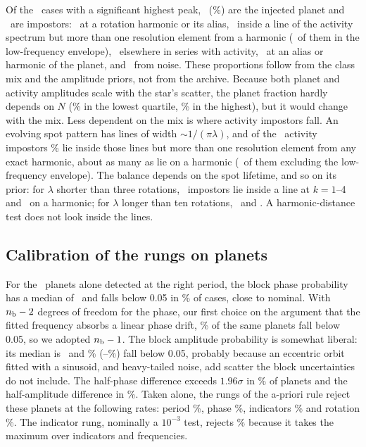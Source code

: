 Of the \nmNDet\ cases with a significant highest peak, \nmNDetPlanet\
(\nmDetPlanetPct\%) are the injected planet and \nmNDetImp\ are impostors:
\nmImpRotHarm\ at a rotation harmonic or its alias, \nmImpRotLine\ inside a line of the
activity spectrum but more than one resolution element from a harmonic (\nmImpEnvelopeN\
of them in the low-frequency envelope), \nmImpActOther\ elsewhere in series with
activity, \nmImpPlAlias\ at an alias or harmonic of the planet, and \nmImpNoise\ from
noise. These proportions follow from the class mix and the amplitude priors, not from
the archive. Because both planet and activity amplitudes scale with the star's scatter,
the planet fraction hardly depends on $N$ (\nmDetPlanetPctNLo\% in the lowest quartile,
\nmDetPlanetPctNHi\% in the highest), but it would change with the mix. Less dependent on
the mix is where activity impostors fall. An evolving spot pattern has lines of width
$\sim 1/(\pi\lambda)$, and of the \nmImpActTotal\ activity impostors \nmImpRotLinePctAct\%
lie inside those lines but more than one resolution element from any exact harmonic,
about as many as lie on a harmonic (\nmImpRotLineNoEnv\ of them excluding the
low-frequency envelope). The balance depends on the spot lifetime, and so on its prior:
for $\lambda$ shorter than three rotations, \nmLineShort\ impostors lie inside a line at
$k = 1$--4 and \nmHarmShort\ on a harmonic; for $\lambda$ longer than ten rotations,
\nmLineLong\ and \nmHarmLong. A harmonic-distance test does not look inside the lines.

\subsection{Calibration of the rungs on planets}
\label{sec:calib}

For the \nmNPlanetOnlyDet\ planets alone detected at the right period, the block phase
probability has a median of \nmBPhMed\ and falls below 0.05 in \nmBPhFive\% of cases,
close to nominal. With $n_{\rm b} - 2$ degrees of freedom for the phase, our first choice
on the argument that the fitted frequency absorbs a linear phase drift, \nmBPhFiveNbTwo\%
of the same planets fall below 0.05, so we adopted $n_{\rm b} - 1$. The block amplitude
probability is somewhat liberal: its median is \nmBAmpMed\ and \nmBAmpFive\%
(\nmBAmpFiveLo--\nmBAmpFiveHi\%) fall below 0.05, probably because an eccentric orbit
fitted with a sinusoid, and heavy-tailed noise, add scatter the block uncertainties do
not include. The half-phase difference exceeds
$1.96\sigma$ in \nmHPhOver\% of planets and the half-amplitude difference in
\nmHAmpOver\%. Taken alone, the rungs of the a-priori rule reject these planets at the
following rates: period \nmRungRejPeriod\%, phase \nmRungRejPhase\%, indicators
\nmRungRejInd\% and rotation \nmRungRejRot\%. The indicator rung, nominally a
$10^{-3}$ test, rejects \nmIndOverPl\% because it takes the maximum over indicators and
frequencies.


